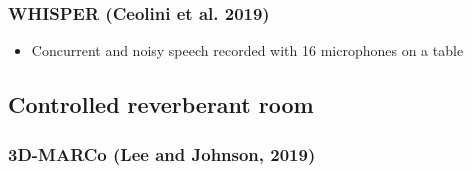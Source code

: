 \documentclass[14pt, oneside]{extarticle}
\begin{document}
\subsubsection{WHISPER (Ceolini et al. 2019)}

\begin{itemize}

\item Concurrent and noisy speech recorded with 16 microphones on a table \cite{ceolini2020evaluating}

\end{itemize}

\subsection{Controlled reverberant room}

\subsubsection{3D-MARCo (Lee and Johnson, 2019)}
\end{document}
